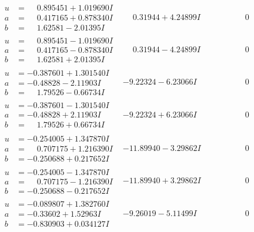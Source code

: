 \documentclass[1p]{elsarticle_modified}
\theoremstyle{definition}
\begin{document}
$$\begin{array}{c|c|c}
\begin{aligned}
u &= \phantom{-}0.895451 + 1.019690 I \\
a &= \phantom{-}0.417165 + 0.878340 I \\
b &= \phantom{-}1.62581 - 2.01395 I\end{aligned}
 & \phantom{-}0.31944 + 4.24899 I & \phantom{-0.000000 } 0 \\ \hline\begin{aligned}
u &= \phantom{-}0.895451 - 1.019690 I \\
a &= \phantom{-}0.417165 - 0.878340 I \\
b &= \phantom{-}1.62581 + 2.01395 I\end{aligned}
 & \phantom{-}0.31944 - 4.24899 I & \phantom{-0.000000 } 0 \\ \hline\begin{aligned}
u &= -0.387601 + 1.301540 I \\
a &= -0.48828 - 2.11903 I \\
b &= \phantom{-}1.79526 - 0.66734 I\end{aligned}
 & -9.22324 - 6.23066 I & \phantom{-0.000000 } 0 \\ \hline\begin{aligned}
u &= -0.387601 - 1.301540 I \\
a &= -0.48828 + 2.11903 I \\
b &= \phantom{-}1.79526 + 0.66734 I\end{aligned}
 & -9.22324 + 6.23066 I & \phantom{-0.000000 } 0 \\ \hline\begin{aligned}
u &= -0.254005 + 1.347870 I \\
a &= \phantom{-}0.707175 + 1.216390 I \\
b &= -0.250688 + 0.217652 I\end{aligned}
 & -11.89940 - 3.29862 I & \phantom{-0.000000 } 0 \\ \hline\begin{aligned}
u &= -0.254005 - 1.347870 I \\
a &= \phantom{-}0.707175 - 1.216390 I \\
b &= -0.250688 - 0.217652 I\end{aligned}
 & -11.89940 + 3.29862 I & \phantom{-0.000000 } 0 \\ \hline\begin{aligned}
u &= -0.089807 + 1.382760 I \\
a &= -0.33602 + 1.52963 I \\
b &= -0.830903 + 0.034127 I\end{aligned}
 & -9.26019 - 5.11499 I & \phantom{-0.000000 } 0 \\ \hline\begin{aligned}

\end{aligned}
\end{array}$$
\end{document}
